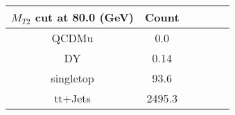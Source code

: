 \documentclass[8pt]{article}
\begin{document}
\begin{tabular}{|c|c|c|c|c|c|}
\hline
$M_{T2}$ cut at 80.0 (GeV) & Count \\
\hline
\hline
QCDMu & 0.0\\
DY & 0.14\\
singletop & 93.6\\
tt+Jets & 2495.3\\
\hline
\hline
\end{tabular}
\end{document}
